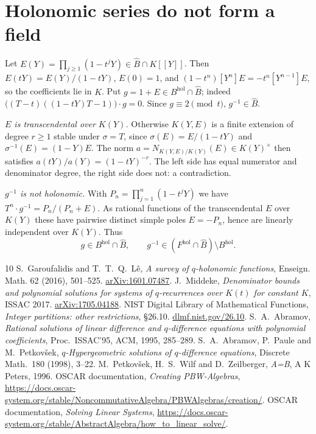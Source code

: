 \documentclass[11pt,a4paper]{article}
\newcommand{\Bhat}{\widehat B}
\newcommand{\Bhol}{B^{\mathrm{hol}}}
\newcommand{\Fhol}{F^{\mathrm{hol}}}
\theoremstyle{plain}
\theoremstyle{definition}
\theoremstyle{remark}
\begin{document}
\appendix
\section{Holonomic series do not form a field}\label{app:not-field}
Let $E(Y)=\prod_{j\ge1}(1-t^jY)\in\Bhat\cap K[[Y]]$. Then $E(tY)=E(Y)/(1-tY)$,
$E(0)=1$, and $(1-t^n)[Y^n]E=-t^n[Y^{n-1}]E$, so the coefficients lie in $K$.
Put $g=1+E\in\Bhol\cap\Bhat$; indeed $\bigl((T-t)((1-tY)T-1)\bigr)\cdot g=0$.
Since $g\equiv2\pmod t$, $g^{-1}\in\Bhat$.

\emph{$E$ is transcendental over $K(Y)$.} Otherwise $K(Y,E)$ is a finite
extension of degree $r\ge1$ stable under $\sigma=T$, since
$\sigma(E)=E/(1-tY)$ and $\sigma^{-1}(E)=(1-Y)E$. The norm
$a=N_{K(Y,E)/K(Y)}(E)\in K(Y)^\times$ then satisfies
$a(tY)/a(Y)=(1-tY)^{-r}$. The left side has equal numerator and denominator
degree, the right side does not: a contradiction.

\emph{$g^{-1}$ is not holonomic.} With $P_n=\prod_{j=1}^n(1-t^jY)$ we have
$T^n\cdot g^{-1}=P_n/(P_n+E)$. As rational functions of the transcendental
$E$ over $K(Y)$ these have pairwise distinct simple poles $E=-P_n$, hence are
linearly independent over $K(Y)$. Thus
\[
  g\in\Bhol\cap\Bhat,\qquad g^{-1}\in(\Fhol\cap\Bhat)\setminus\Bhol.
\]

\begin{thebibliography}{10}
 S.~Garoufalidis and T.~T.~Q.~L\^e,
\emph{A survey of $q$-holonomic functions}, Enseign. Math. 62 (2016), 501--525.
\href{https://arxiv.org/abs/1601.07487}{arXiv:1601.07487}.
 J.~Middeke,
\emph{Denominator bounds and polynomial solutions for systems of $q$-recurrences
over $K(t)$ for constant $K$}, ISSAC 2017.
\href{https://arxiv.org/abs/1705.04188}{arXiv:1705.04188}.
 NIST Digital Library of Mathematical Functions,
\emph{Integer partitions: other restrictions}, \S26.10.
\href{https://dlmf.nist.gov/26.10}{dlmf.nist.gov/26.10}.
 S.~A.~Abramov, \emph{Rational solutions of linear difference
and $q$-difference equations with polynomial coefficients}, Proc.\ ISSAC'95, ACM,
1995, 285--289.
 S.~A.~Abramov, P.~Paule and M.~Petkov\v{s}ek,
\emph{$q$-Hypergeometric solutions of $q$-difference equations},
Discrete Math.\ 180 (1998), 3--22.
 M.~Petkov\v{s}ek, H.~S.~Wilf and D.~Zeilberger, \emph{A=B},
A K Peters, 1996.
 OSCAR documentation, \emph{Creating PBW-Algebras},
\url{https://docs.oscar-system.org/stable/NoncommutativeAlgebra/PBWAlgebras/creation/}.
 OSCAR documentation, \emph{Solving Linear Systems},
\url{https://docs.oscar-system.org/stable/AbstractAlgebra/how_to_linear_solve/}.
\end{thebibliography}
\end{document}
